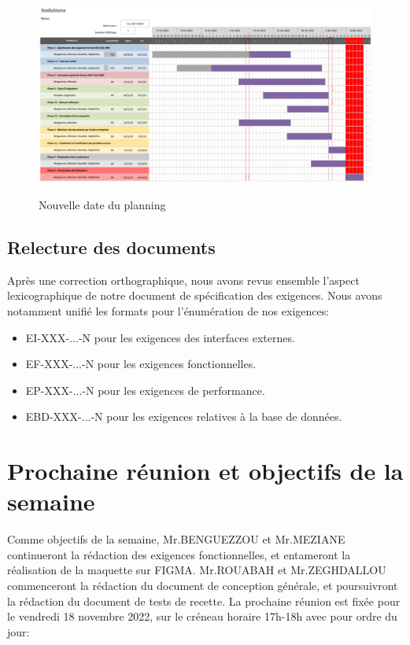 \documentclass[a4paper, 12pt]{article}
\begin{document}
 \begin{figure}[!h]
    \centering
    \includegraphics[scale=0.4648]{Diagramme de gantt.png}
    \label{fig:Le_planning}
    \caption{Nouvelle date du planning}
\end{figure}

\newpage
\subsection{Relecture des documents}
Après une correction orthographique, nous avons revus ensemble l'aspect lexicographique de notre document de spécification des exigences.
Nous avons notamment unifié les formats pour l'énumération de nos exigences: \\
\begin{itemize}
\item EI-XXX-...-N pour les exigences des interfaces externes.\\
\item EF-XXX-...-N pour les exigences fonctionnelles.\\
\item EP-XXX-...-N pour les exigences de performance.\\
\item EBD-XXX-...-N pour les exigences relatives à la base de données.
\end{itemize}


\section{Prochaine réunion et objectifs de la semaine}
Comme objectifs de la semaine, Mr.BENGUEZZOU et Mr.MEZIANE continueront la rédaction des exigences fonctionnelles, et entameront la réalisation de la maquette sur FIGMA.
Mr.ROUABAH et Mr.ZEGHDALLOU commenceront la rédaction du document de conception générale, et poursuivront la rédaction du document de tests de recette. 
La prochaine réunion est fixée pour le vendredi 18 novembre 2022, sur le créneau horaire 17h-18h avec pour ordre du jour: \\
\end{document}
